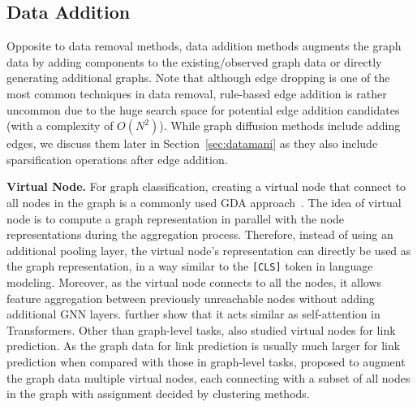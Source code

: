 \documentclass[11pt]{article}
\renewcommand\paragraph[1]{\vspace{0.05in} \noindent \textbf{#1.}}
\begin{document}
\subsection{Data Addition}
\label{sec:dataadd}
Opposite to data removal methods, data addition methods augments the graph data by adding components to the existing/observed graph data or directly generating additional graphs. Note that although edge dropping is one of the most common techniques in data removal, rule-based edge addition is rather uncommon due to the huge search space for potential edge addition candidates (with a complexity of $O(N^2)$). While graph diffusion methods include adding edges, we discuss them later in Section~\ref{sec:datamani} as they also include sparsification operations after edge addition.

\paragraph{Virtual Node}
For graph classification, creating a virtual node that connect to all nodes in the graph is a commonly used GDA approach~\cite{gilmer2017neural,li2017learning,ishiguro2019graph,hu2021ogb,ying2021transformers}. The idea of virtual node is to compute a graph representation in parallel with the node representations during the aggregation process. Therefore, instead of using an additional pooling layer, the virtual node's representation can directly be used as the graph representation, in a way similar to the \texttt{[CLS]} token in language modeling. Moreover, as the virtual node connects to all the nodes, it allows feature aggregation between previously unreachable nodes without adding additional GNN layers. \citet{ying2021transformers} further show that it acts similar as self-attention in Transformers. Other than graph-level tasks, \citet{hwang2021revisiting} also studied virtual nodes for link prediction. As the graph data for link prediction is usually much larger for link prediction when compared with those in graph-level tasks, \citet{hwang2021revisiting} proposed to augment the graph data multiple virtual nodes, each connecting with a subset of all nodes in the graph with assignment decided by clustering methods.
\end{document}
